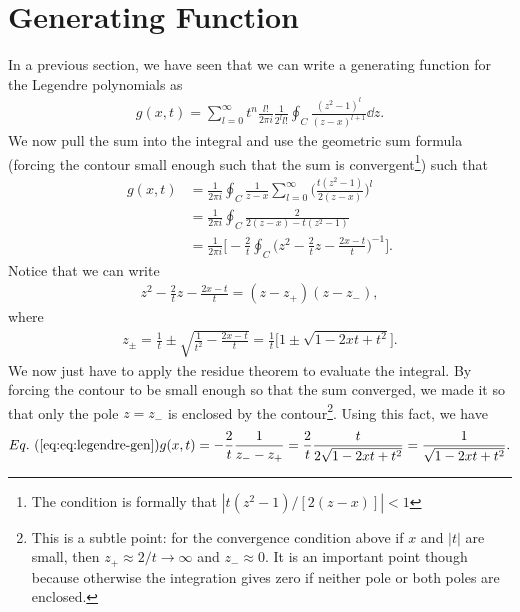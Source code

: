 \section{Generating Function}

In a previous section, we have seen that we can write a generating function for the Legendre polynomials as
\begin{eqnarray}
    g(x,t) = \sum_{l=0}^{\infty} t^{n} \frac{l!}{2 \pi i} \frac{1}{2^{l} l!} \oint_{C} \frac{(z^2 - 1)^{l}}{(z - x)^{l+1}} \dd{z}
.\end{eqnarray}
We now pull the sum into the integral and use the geometric sum formula (forcing the contour small enough such that the sum is convergent\footnote{The condition is formally that $| t(z^2 - 1)/[2(z-x)] | < 1$}) such that
\begin{align}
    g(x,t) &= \frac{1}{2 \pi i} \oint_{C} \frac{1}{z-x} \sum_{l=0}^{\infty} \Bigg( \frac{t(z^2 - 1)}{2(z-x)} \Bigg)^{l} \nonumber \\
    &= \frac{1}{2 \pi i} \oint_{C} \frac{2}{2(z-x) - t(z^2 - 1)} \nonumber \\
    &= \frac{1}{2 \pi i} \Bigg[- \frac{2}{t} \oint_{C} \Big( z^2 - \frac{2}{t} z - \frac{2x - t}{t} \Big)^{-1} \Bigg]
.\end{align}
Notice that we can write
\begin{eqnarray}
    z^2 - \frac{2}{t} z - \frac{2x - t}{t} = (z - z_{+}) (z - z_{-})
,\end{eqnarray}
where
\begin{eqnarray}
    z_{\pm} = \frac{1}{t} \pm \sqrt{ \frac{1}{t^2} - \frac{2x - t}{t} } = \frac{1}{t} \Big[ 1 \pm \sqrt{1 - 2xt + t^2} \Big]
.\end{eqnarray}
We now just have to apply the residue theorem to evaluate the integral.
By forcing the contour to be small enough so that the sum converged, we made it so that only the pole $z = z_{-}$ is enclosed by the contour\footnote{This is a subtle point: for the convergence condition above if $x$ and $|t|$ are small, then $z_{+} \approx 2/t \rightarrow \infty$ and $z_{-} \approx 0$. It is an important point though because otherwise the integration gives zero if neither pole or both poles are enclosed.}.
Using this fact, we have
\begin{eqnarray}
    \eref{eq:legendre-gen}
    g(x,t) = -\frac{2}{t} \frac{1}{z_{-} - z_{+}} = \frac{2}{t} \frac{t}{2\sqrt{1 - 2xt + t^2}} = \frac{1}{\sqrt{1 - 2xt + t^2}}
.\end{eqnarray}

